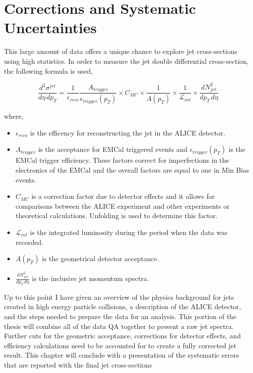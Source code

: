 \chapter{Corrections and Systematic Uncertainties} \label{ch:error}

This large amount of data offers a unique chance to explore jet cross-sections using high statistics.   In order to measure the jet double differential cross-section, the following formula is used,

\begin{equation}
	\frac{d^{2} \sigma^{jet}}{d\eta \, dp_{T}} = \frac{1}{\epsilon_{reco}} \frac{A_{trigger}}{\epsilon_{trigger}(p_{T})} \times C_{MC} \times \frac{1}{A(p_{T}) } \times \frac{1}{\mathscr{L}_{int}} \times \frac{dN^{2}_{jet}}{dp_{T} \, d\eta}
\label{eq:xsecdef}
\end{equation}

\noindent
where,

\begin{itemize}
  \item $\epsilon_{reco}$ is the efficency for reconstructing the jet in the ALICE detector.
  \item $A_{trigger}$ is the acceptance for EMCal triggered events and $\epsilon_{trigger}(p_{T})$ is the EMCal trigger efficiency.  These factors correct for imperfections in the electronics of the EMCal and the overall factors are equal to one in Min Bias events.
  \item $C_{MC}$ is a correction factor due to detector effects and it allows for comparisons between the ALICE experiment and other experiments or theoretical calculations.  Unfolding is used to determine this factor.
  \item $\mathscr{L}_{int}$ is the integrated luminosity during the period when the data was recorded.
  \item $A(p_{T})$ is the geometrical detector acceptance.
  \item $\frac{dN^{2}_{jet}}{dp_{T} \, d\eta}$ is the inclusive jet momentum spectra.
  
\end{itemize}

Up to this point I have given an overview of the physics background for jets created in high energy particle collisions, a description of the ALICE detector, and the steps needed to prepare the data for an analysis.  This portion of the thesis will combine all of the data QA together to present a raw jet spectra.  Further cuts for the geometric acceptance, corrections for detector effects, and efficiency calculations need to be accounted for to create a fully corrected jet result.  This chapter will conclude with a presentation of the systematic errors that are reported with the final jet cross-sections

